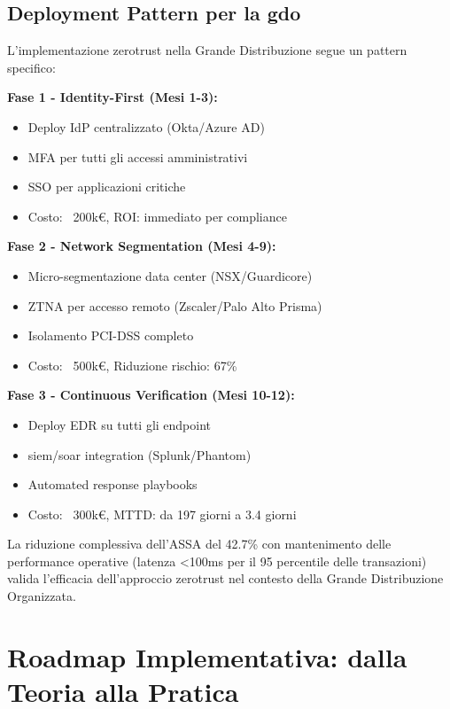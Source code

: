 \subsection{\texorpdfstring{Deployment Pattern per la \gls{gdo}}{3.5.5 - Deployment Pattern per la GDO}}

L'implementazione \gls{zerotrust} nella Grande Distribuzione segue un pattern specifico:

\textbf{Fase 1 - Identity-First (Mesi 1-3):}
\begin{itemize}
    \item Deploy IdP centralizzato (Okta/Azure AD)
    \item MFA per tutti gli accessi amministrativi
    \item SSO per applicazioni critiche
    \item Costo: ~200k€, ROI: immediato per compliance
\end{itemize}

\textbf{Fase 2 - Network Segmentation (Mesi 4-9):}
\begin{itemize}
    \item Micro-segmentazione data center (NSX/Guardicore)
    \item ZTNA per accesso remoto (Zscaler/Palo Alto Prisma)
    \item Isolamento PCI-DSS completo
    \item Costo: ~500k€, Riduzione rischio: 67\%
\end{itemize}

\textbf{Fase 3 - Continuous Verification (Mesi 10-12):}
\begin{itemize}
    \item Deploy EDR su tutti gli endpoint
    \item \gls{siem}/\gls{soar} integration (Splunk/Phantom)
    \item Automated response playbooks
    \item Costo: ~300k€, MTTD: da 197 giorni a 3.4 giorni
\end{itemize}

La riduzione complessiva dell'ASSA del 42.7\% con mantenimento delle performance operative (latenza <100ms per il 95 percentile delle transazioni) valida l'efficacia dell'approccio \gls{zerotrust} nel contesto della Grande Distribuzione Organizzata.

\section{\texorpdfstring{Roadmap Implementativa: dalla Teoria alla Pratica}{3.6 - Roadmap Implementativa: dalla Teoria alla Pratica}}

